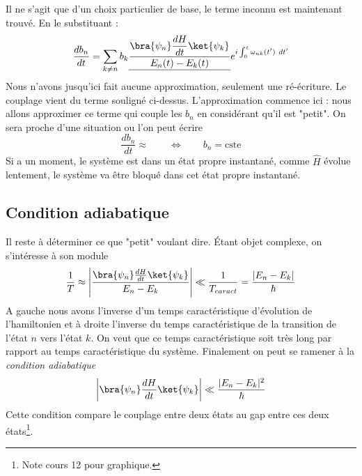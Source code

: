 Il ne s'agit que d'un choix particulier de base, le terme inconnu est maintenant trouvé. En le 
substituant :
\begin{equation}
\frac{db_n}{dt} = \sum_{k\neq n} b_k \underline{\dfrac{\bra{\psi_n}\dfrac{dH}{dt}\ket{\psi_k}}{E_n(t)-E_k(t)}}
e^{i\int_0^t \omega_{nk}(t')\ dt'}
\end{equation}
Nous n'avons jusqu'ici fait aucune approximation, seulement une ré-écriture. Le couplage 
vient du terme souligné ci-dessus. L'approximation commence ici : nous allons approximer ce 
terme qui couple les $b_n$ en considérant qu'il est "petit". On sera proche d'une situation 
ou l'on peut écrire
\begin{equation}
\dfrac{db_n}{dt}\approx\qquad\Leftrightarrow\qquad b_n = \text{cste}
\end{equation}
Si a un moment, le système est dans un état propre instantané, comme $\hat{H}$ évolue lentement, 
le système va être bloqué dans cet état propre instantané.


	\subsection{Condition adiabatique}
	Il reste à déterminer ce que "petit" voulant dire. Étant objet complexe, on s'intéresse à son module
	\begin{equation}
	\frac{1}{T}\approx\left|\dfrac{\bra{\psi_n}\frac{dH}{dt}\ket{\psi_k}}{E_n-E_k}\right| \ll \dfrac{1}{
	T_{caract}} = \dfrac{|E_n-E_k|}{\hbar}
	\end{equation}
	A gauche nous avons l'inverse d'un temps caractéristique d'évolution de l'hamiltonien et à droite 
	l'inverse du temps caractéristique de la transition de l'état $n$ vers l'état $k$. On veut que ce 
	temps caractéristique soit très long par rapport au temps caractéristique	du système. Finalement 
	on peut se ramener à la \textit{condition adiabatique}
	\begin{equation}
	\left|\bra{\psi_n}\frac{dH}{dt}\ket{\psi_k}\right| \ll \dfrac{|E_n-E_k|^2}{\hbar}
	\end{equation}
	Cette condition compare le couplage entre deux états au gap entre ces deux états\footnote{Note cours 12
	pour graphique.}. 